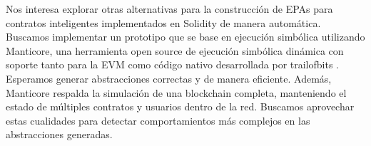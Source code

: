 Nos interesa explorar otras alternativas para la construcción de EPAs para contratos inteligentes implementados en Solidity de manera automática.
Buscamos implementar un prototipo que se base en ejecución simbólica utilizando Manticore, una herramienta open source de ejecución simbólica dinámica con soporte tanto para la EVM como código nativo desarrollada por trailofbits \cite{manticore}.
Esperamos generar abstracciones correctas y de manera eficiente.
Además, Manticore respalda la simulación de una blockchain completa, manteniendo el estado de múltiples contratos y usuarios dentro de la red.
Buscamos aprovechar estas cualidades para detectar comportamientos más complejos en las abstracciones generadas.
